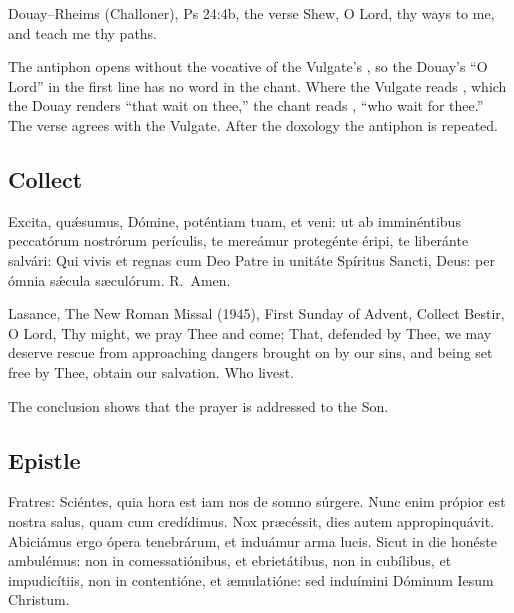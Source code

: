 \begin{englishwitness}{Douay--Rheims (Challoner), Ps 24:4b, the verse}
Shew, O Lord, thy ways to me, and teach me thy paths.
\end{englishwitness}

\noindent The antiphon opens  without the vocative of the
Vulgate's , so the Douay's ``O Lord'' in the first
line has no word in the chant. Where the Vulgate reads ,
which the Douay renders ``that wait on thee,'' the chant reads , ``who wait for thee.'' The verse agrees with the Vulgate. After
the doxology the antiphon is repeated.

\subsection{Collect}
\label{proper-collect}


\begin{latinproper}
Excita, quǽsumus, Dómine, poténtiam tuam, et veni: ut ab imminéntibus
peccatórum nostrórum perículis, te mereámur protegénte éripi, te liberánte
salvári: Qui vivis et regnas cum Deo Patre in unitáte Spíritus Sancti, Deus:
per ómnia sǽcula sæculórum. R.~Amen.
\end{latinproper}

\begin{englishwitness}{Lasance, The New Roman Missal (1945), First Sunday of Advent, Collect}
Bestir, O Lord, Thy might, we pray Thee and come; That, defended by Thee, we
may deserve rescue from approaching dangers brought on by our sins, and being
set free by Thee, obtain our salvation. Who livest.
\end{englishwitness}

\noindent The conclusion  shows that
the prayer is addressed to the Son.

\subsection{Epistle}
\label{proper-epistle}


\begin{latinproper}
Fratres: Sciéntes, quia hora est iam nos de somno súrgere. Nunc enim própior
est nostra salus, quam cum credídimus. Nox præcéssit, dies autem
appropinquávit. Abiciámus ergo ópera tenebrárum, et induámur arma lucis.
Sicut in die honéste ambulémus: non in comessatiónibus, et ebrietátibus, non
in cubílibus, et impudicítiis, non in contentióne, et æmulatióne: sed
induímini Dóminum Iesum Christum.
\end{latinproper}

